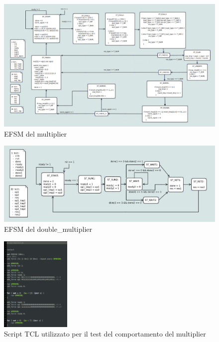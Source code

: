 \documentclass[]{IEEEtran}
\begin{document}
\begin{figure}[bt]
    \centering
    \includegraphics[width=\textwidth]{figures/EFSM-multiplier}
    \caption{EFSM del multiplier}
    \label{fig:EFSM_multiplier}
\end{figure}

\begin{figure}[bt]
    \centering
    \includegraphics[width=\textwidth]{figures/EFSM-top_level}
    \caption{EFSM del double\_multiplier}
    \label{fig:EFSM_double_multiplier}
\end{figure}



\begin{figure}[bt]
    \centering
    \includegraphics[width=0.3\textwidth]{figures/sim_mult_script}
    \caption{Script TCL utilizzato per il test del comportamento del multiplier}
    \label{fig:SCRIPT_MULT}
\end{figure}
\end{document}
